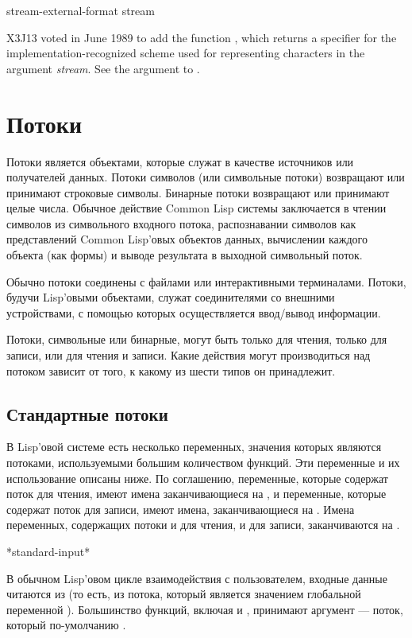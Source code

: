 \begin{defun}[Function]
stream-external-format stream

X3J13 voted in June 1989  to add the
function , which returns a
specifier for the implementation-recognized scheme used for
representing characters in the argument \emph{stream}.
See the  argument to .
\end{defun}

\else

\chapter{Потоки}
\label{STREAM}

Потоки является объектами, которые служат в качестве источников или получателей
данных.
Потоки символов (или символьные потоки) возвращают или принимают строковые
символы.
Бинарные потоки возвращают или принимают целые числа.
Обычное действие Common Lisp системы заключается в чтении символов из
символьного входного потока, распознавании символов как представлений Common
Lisp'овых объектов данных, вычислении каждого объекта (как формы) и выводе
результата в выходной символьный поток.

Обычно потоки соединены с файлами или интерактивными терминалами. 
Потоки, будучи Lisp'овыми объектами, служат соединителями со внешними
устройствами, с помощью которых осуществляется ввод/вывод информации.

Потоки, символьные или бинарные, могут быть только для чтения, только для
записи, или для чтения и записи.
Какие действия могут производиться над потоком зависит от того, к какому из шести
типов он принадлежит.

\section{Стандартные потоки}

В Lisp'овой системе есть несколько переменных, значения которых являются
потоками, используемыми большим количеством функций. Эти переменные и их
использование описаны ниже. По соглашению, переменные, которые содержат поток
для чтения, имеют имена заканчивающиеся на , и переменные, которые
содержат поток для записи, имеют имена, заканчивающиеся на .  Имена
переменных, содержащих потоки и для чтения, и для записи, заканчиваются на
.

\begin{defun}[Переменная]
*standard-input*

В обычном Lisp'овом цикле взаимодействия с пользователем, входные данные
читаются из  (то есть, из потока, который является
значением глобальной переменной ). Большинство функций,
включая  и , принимают аргумент --- поток, который
по-умолчанию . 
\end{defun}

